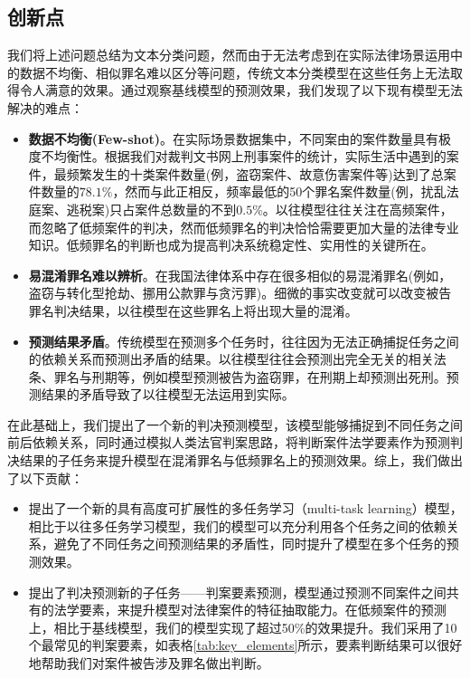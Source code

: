 \subsection{创新点}
我们将上述问题总结为文本分类问题，然而由于无法考虑到在实际法律场景运用中的数据不均衡、相似罪名难以区分等问题，传统文本分类模型在这些任务上无法取得令人满意的效果。通过观察基线模型的预测效果，我们发现了以下现有模型无法解决的难点：
\begin{itemize}
	\item \textbf{数据不均衡(Few-shot)}。在实际场景数据集中，不同案由的案件数量具有极度不均衡性。根据我们对裁判文书网上刑事案件的统计，实际生活中遇到的案件，最频繁发生的十类案件数量(例，盗窃案件、故意伤害案件等)达到了总案件数量的$78.1\%$，然而与此正相反，频率最低的50个罪名案件数量(例，扰乱法庭案、逃税案)只占案件总数量的不到$0.5\%$。以往模型往往关注在高频案件，而忽略了低频案件的判决，然而低频罪名的判决恰恰需要更加大量的法律专业知识。低频罪名的判断也成为提高判决系统稳定性、实用性的关键所在。
	\item \textbf{易混淆罪名难以辨析}。在我国法律体系中存在很多相似的易混淆罪名(例如，盗窃与转化型抢劫、挪用公款罪与贪污罪)。细微的事实改变就可以改变被告罪名判决结果，以往模型在这些罪名上将出现大量的混淆。
	\item \textbf{预测结果矛盾}。传统模型在预测多个任务时，往往因为无法正确捕捉任务之间的依赖关系而预测出矛盾的结果。以往模型往往会预测出完全无关的相关法条、罪名与刑期等，例如模型预测被告为盗窃罪，在刑期上却预测出死刑。预测结果的矛盾导致了以往模型无法运用到实际。
\end{itemize}

在此基础上，我们提出了一个新的判决预测模型，该模型能够捕捉到不同任务之间前后依赖关系，同时通过模拟人类法官判案思路，将判断案件法学要素作为预测判决结果的子任务来提升模型在混淆罪名与低频罪名上的预测效果。综上，我们做出了以下贡献：

\begin{itemize}
	\item 提出了一个新的具有高度可扩展性的多任务学习（multi-task learning）模型，相比于以往多任务学习模型，我们的模型可以充分利用各个任务之间的依赖关系，避免了不同任务之间预测结果的矛盾性，同时提升了模型在多个任务的预测效果。
	\item 提出了判决预测新的子任务——判案要素预测，模型通过预测不同案件之间共有的法学要素，来提升模型对法律案件的特征抽取能力。在低频案件的预测上，相比于基线模型，我们的模型实现了超过50\%的效果提升。我们采用了10个最常见的判案要素，如表格\ref{tab:key_elements}所示，要素判断结果可以很好地帮助我们对案件被告涉及罪名做出判断。
	\end{itemize}

